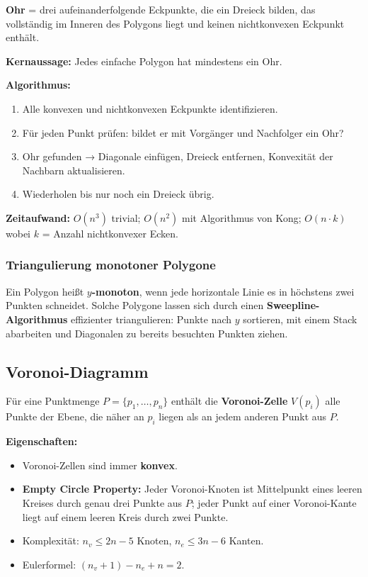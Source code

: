 \documentclass[12pt, a4paper]{article}
\begin{document}
\textbf{Ohr} = drei aufeinanderfolgende Eckpunkte, die ein Dreieck bilden, das vollständig im Inneren des Polygons liegt und keinen nichtkonvexen Eckpunkt enthält.

\textbf{Kernaussage:} Jedes einfache Polygon hat mindestens ein Ohr.

\textbf{Algorithmus:}
\begin{enumerate}
  \item Alle konvexen und nichtkonvexen Eckpunkte identifizieren.
  \item Für jeden Punkt prüfen: bildet er mit Vorgänger und Nachfolger ein Ohr?
  \item Ohr gefunden → Diagonale einfügen, Dreieck entfernen, Konvexität der Nachbarn aktualisieren.
  \item Wiederholen bis nur noch ein Dreieck übrig.
\end{enumerate}

\textbf{Zeitaufwand:} $O(n^3)$ trivial; $O(n^2)$ mit Algorithmus von Kong; $O(n \cdot k)$ wobei $k$ = Anzahl nichtkonvexer Ecken.

\subsubsection*{Triangulierung monotoner Polygone}

Ein Polygon heißt \textbf{$y$-monoton}, wenn jede horizontale Linie es in höchstens zwei Punkten schneidet. Solche Polygone lassen sich durch einen \textbf{Sweepline-Algorithmus} effizienter triangulieren: Punkte nach $y$ sortieren, mit einem Stack abarbeiten und Diagonalen zu bereits besuchten Punkten ziehen.

\subsection{Voronoi-Diagramm}

Für eine Punktmenge $P = \{p_1, \dots, p_n\}$ enthält die \textbf{Voronoi-Zelle} $V(p_i)$ alle Punkte der Ebene, die näher an $p_i$ liegen als an jedem anderen Punkt aus $P$.

\textbf{Eigenschaften:}
\begin{itemize}
  \item Voronoi-Zellen sind immer \textbf{konvex}.
  \item \textbf{Empty Circle Property:} Jeder Voronoi-Knoten ist Mittelpunkt eines leeren Kreises durch genau drei Punkte aus $P$; jeder Punkt auf einer Voronoi-Kante liegt auf einem leeren Kreis durch zwei Punkte.
  \item Komplexität: $n_v \leq 2n-5$ Knoten, $n_e \leq 3n-6$ Kanten.
  \item Eulerformel: $(n_v + 1) - n_e + n = 2$.
\end{itemize}
\end{document}
